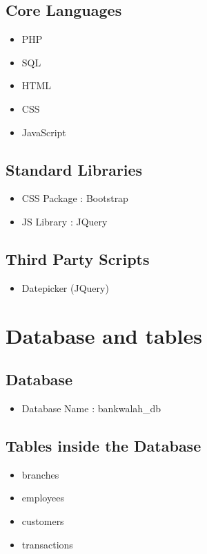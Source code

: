 \documentclass{article}
\begin{document}
\subsection{Core Languages}
\begin{itemize}
 \item PHP
 \item SQL
 \item HTML
 \item CSS
 \item JavaScript
\end{itemize}

\subsection{Standard Libraries}
\begin{itemize}
 \item CSS Package : Bootstrap
 \item JS Library : JQuery
\end{itemize}

\subsection{Third Party Scripts}
\begin{itemize}
 \item Datepicker (JQuery)
\end{itemize}
\pagebreak


\section{Database and tables}
\subsection{Database}
\begin{itemize}
 \item Database Name : bankwalah\_db
\end{itemize}

\subsection{Tables inside the Database}
\begin{itemize}
 \item branches
 \item employees
 \item customers
 \item transactions
\end{itemize}
\pagebreak
\end{document}
